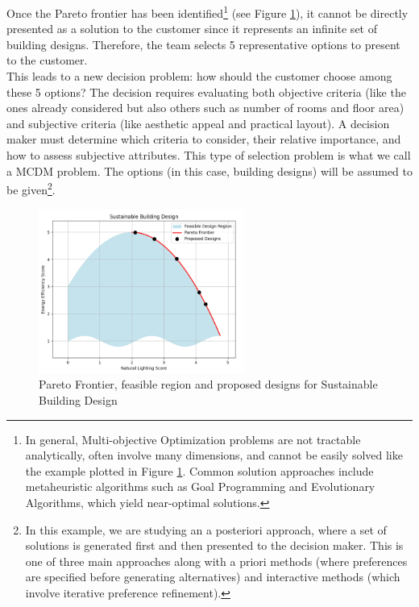 Once the Pareto frontier has been identified\footnote{In general, Multi-objective Optimization problems are not tractable analytically, often involve many dimensions, and cannot be easily solved like the example plotted in Figure \ref{fig:pareto_frontier}. Common solution approaches include metaheuristic algorithms such as Goal Programming and Evolutionary Algorithms, which yield near-optimal solutions.}
(see Figure \ref{fig:pareto_frontier}), it cannot be directly presented as a solution to the customer since it represents an infinite set of building designs. Therefore, the team selects 5 representative options to present to the customer. \\

This leads to a new decision problem: how should the customer choose among these 5 options? The decision requires evaluating both objective criteria (like the ones already considered but also others such as number of rooms and floor area) and subjective criteria (like aesthetic appeal and practical layout). A decision maker must determine which criteria to consider, their relative importance, and how to assess subjective attributes. This type of selection problem is what we call a MCDM problem. The options (in this case, building designs) will be assumed to be given\footnote{
In this example, we are studying an a posteriori approach, where a set of solutions is generated first and then presented to the decision maker. This is one of three main approaches along with a priori methods (where preferences are specified before generating alternatives) and interactive methods (which involve iterative preference refinement).}.

\begin{figure}[ht]
    \centering
    \includegraphics[width=0.6\textwidth]{ch2/figures/pareto.png}
    \caption{Pareto Frontier, feasible region and proposed designs for Sustainable Building Design}
    \label{fig:pareto_frontier}
\end{figure}

